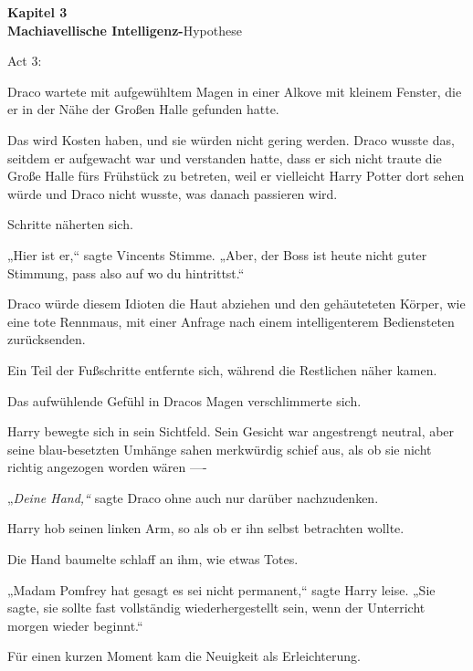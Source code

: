 

\hypertarget{machiavellische-intelligenz-hypothese}{%

\textbf{Kapitel 3}\\ \textbf{Machiavellische Intelligenz-}Hypothese

Act 3:

Draco wartete mit aufgewühltem Magen in einer Alkove mit kleinem Fenster, die er in der Nähe der Großen Halle gefunden hatte.

Das wird Kosten haben, und sie würden nicht gering werden. Draco wusste das, seitdem er aufgewacht war und verstanden hatte, dass er sich nicht traute die Große Halle fürs Frühstück zu betreten, weil er vielleicht Harry Potter dort sehen würde und Draco nicht wusste, was danach passieren wird.

Schritte näherten sich.

„Hier ist er,“ sagte Vincents Stimme. „Aber, der Boss ist heute nicht guter Stimmung, pass also auf wo du hintrittst.“

Draco würde diesem Idioten die Haut abziehen und den gehäuteteten Körper, wie eine tote Rennmaus, mit einer Anfrage nach einem intelligenterem Bediensteten zurücksenden.

Ein Teil der Fußschritte entfernte sich, während die Restlichen näher kamen.

Das aufwühlende Gefühl in Dracos Magen verschlimmerte sich.

Harry bewegte sich in sein Sichtfeld. Sein Gesicht war angestrengt neutral, aber seine blau-besetzten Umhänge sahen merkwürdig schief aus, als ob sie nicht richtig angezogen worden wären ----

„\emph{Deine Hand,“} sagte Draco ohne auch nur darüber nachzudenken.

Harry hob seinen linken Arm, so als ob er ihn selbst betrachten wollte.

Die Hand baumelte schlaff an ihm, wie etwas Totes.

„Madam Pomfrey hat gesagt es sei nicht permanent,“ sagte Harry leise. „Sie sagte, sie sollte fast vollständig wiederhergestellt sein, wenn der Unterricht morgen wieder beginnt.“

Für einen kurzen Moment kam die Neuigkeit als Erleichterung.

}
